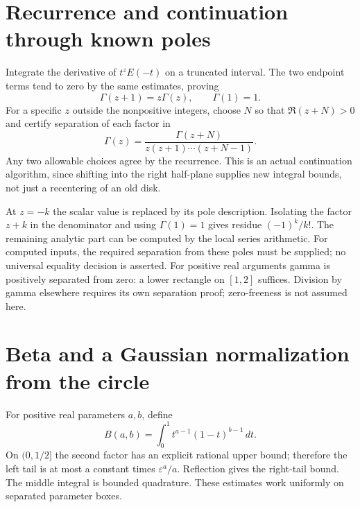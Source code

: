 \section{Recurrence and continuation through known poles}
Integrate the derivative of $t^zE(-t)$ on a truncated interval.  The two
endpoint terms tend to zero by the same estimates, proving
\[
 \Gamma(z+1)=z\Gamma(z),\qquad \Gamma(1)=1.
\]
For a specific $z$ outside the nonpositive integers, choose $N$ so that
$\Re(z+N)>0$ and certify separation of each factor in
\[
 \boxed{\Gamma(z)=\frac{\Gamma(z+N)}{z(z+1)\cdots(z+N-1)}.}
\]
Any two allowable choices agree by the recurrence.  This is an actual
continuation algorithm, since shifting into the right half-plane supplies
new integral bounds, not just a recentering of an old disk.

At $z=-k$ the scalar value is replaced by its pole description.  Isolating
the factor $z+k$ in the denominator and using $\Gamma(1)=1$ gives residue
$(-1)^k/k!$.  The remaining analytic part can be computed by the local
series arithmetic.  For computed inputs, the required separation from
these poles must be supplied; no universal equality decision is asserted.
For positive real arguments gamma is positively separated from zero:
a lower rectangle on $[1,2]$ suffices.  Division by gamma elsewhere
requires its own separation proof; zero-freeness is not assumed here.

\section{Beta and a Gaussian normalization from the circle}
For positive real parameters $a,b$, define
\[
 B(a,b)=\int_0^1 t^{a-1}(1-t)^{b-1}\,dt.
\]
On $(0,1/2]$ the second factor has an explicit rational upper bound;
therefore the left tail is at most a constant times $\varepsilon^a/a$.
Reflection gives the right-tail bound.  The middle integral is bounded
quadrature.  These estimates work uniformly on separated parameter boxes.

